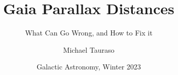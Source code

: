 \documentclass[hyperref={colorlinks = true, linkcolor=blue},8pt]{beamer}
\title[] %
{Gaia Parallax Distances}
\subtitle[]{What Can Go Wrong, and How to Fix it}
\author[] %
{Michael Tauraso}
\date[ASTRO 511, Galaxies] %
{Galactic Astronomy, Winter 2023}
\begin{document}
\begin{frame}
  \titlepage
\end{frame}


% 




%
 
%
%
% 
\end{document}
